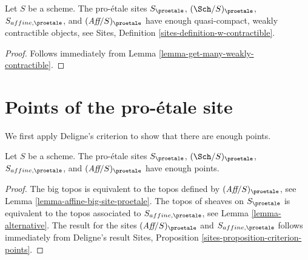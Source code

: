 \begin{lemma}
\label{lemma-proetale-enough-w-contractible}
Let $S$ be a scheme. The pro-\'etale sites
$S_\proetale$, $(\Sch/S)_\proetale$, $S_{affine, \proetale}$, and
$(\textit{Aff}/S)_\proetale$ have enough quasi-compact, weakly contractible
objects, see Sites, Definition \ref{sites-definition-w-contractible}.
\end{lemma}

\begin{proof}
Follows immediately from Lemma \ref{lemma-get-many-weakly-contractible}.
\end{proof}







\section{Points of the pro-\'etale site}
\label{section-points}

\noindent
We first apply Deligne's criterion to show that there are enough points.

\begin{lemma}
\label{lemma-points-proetale}
Let $S$ be a scheme. The pro-\'etale sites
$S_\proetale$, $(\Sch/S)_\proetale$, $S_{affine, \proetale}$, and
$(\textit{Aff}/S)_\proetale$ have enough points.
\end{lemma}

\begin{proof}
The big topos is equivalent to the topos defined by
$(\textit{Aff}/S)_\proetale$, see
Lemma \ref{lemma-affine-big-site-proetale}.
The topos of sheaves on $S_\proetale$ is equivalent to the topos
associated to $S_{affine, \proetale}$, see
Lemma \ref{lemma-alternative}.
The result for the sites $(\textit{Aff}/S)_\proetale$ and
$S_{affine, \proetale}$ follows immediately from Deligne's result
Sites, Proposition \ref{sites-proposition-criterion-points}.
\end{proof}

